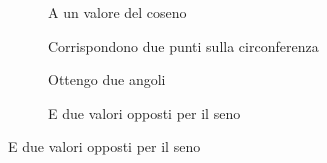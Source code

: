 \begin{figure}
	\begin{subfigure}[b]{.5\linewidth}
		\centering
	\caption{A un valore del coseno}\label{fig:senoNotoCoseno1}
	\end{subfigure}%
	\begin{subfigure}[b]{.5\linewidth}
		\centering
		\caption{Corrispondono due punti sulla circonferenza}\label{fig:senoNotoCoseno2}
	\end{subfigure}
	\begin{subfigure}[b]{.5\linewidth}
		\centering
		\caption{Ottengo due angoli}\label{fig:senoNotoCoseno3}
	\end{subfigure}%
	\begin{subfigure}[b]{.5\linewidth}
		\centering
		\caption{E due valori opposti per il seno}\label{fig:senoNotoCoseno4}
	\end{subfigure}
	\label{fig:senoNotoCosenoEs1}
\end{figure}
